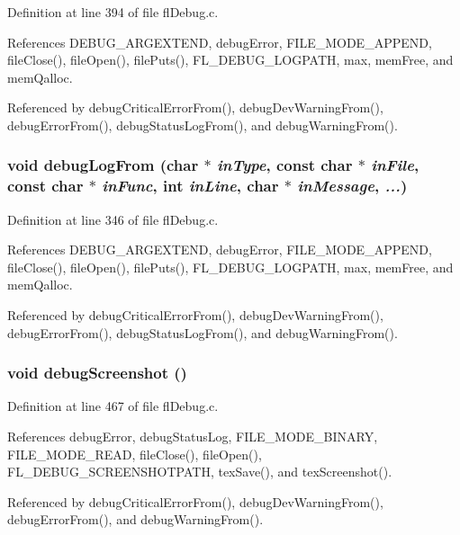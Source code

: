 Definition at line 394 of file fl\-Debug.c.

References DEBUG\_\-ARGEXTEND, debug\-Error, FILE\_\-MODE\_\-APPEND, file\-Close(), file\-Open(), file\-Puts(), FL\_\-DEBUG\_\-LOGPATH, max, mem\-Free, and mem\-Qalloc.

Referenced by debug\-Critical\-Error\-From(), debug\-Dev\-Warning\-From(), debug\-Error\-From(), debug\-Status\-Log\-From(), and debug\-Warning\-From().
\subsubsection{\setlength{\rightskip}{0pt plus 5cm}void debug\-Log\-From (char $\ast$ {\em in\-Type}, const char $\ast$ {\em in\-File}, const char $\ast$ {\em in\-Func}, int {\em in\-Line}, char $\ast$ {\em in\-Message},  {\em ...})}\label{flDebug_8c_79821f9452c6693004f6d30bb36ac990}




Definition at line 346 of file fl\-Debug.c.

References DEBUG\_\-ARGEXTEND, debug\-Error, FILE\_\-MODE\_\-APPEND, file\-Close(), file\-Open(), file\-Puts(), FL\_\-DEBUG\_\-LOGPATH, max, mem\-Free, and mem\-Qalloc.

Referenced by debug\-Critical\-Error\-From(), debug\-Dev\-Warning\-From(), debug\-Error\-From(), debug\-Status\-Log\-From(), and debug\-Warning\-From().
\subsubsection{\setlength{\rightskip}{0pt plus 5cm}void debug\-Screenshot ()}\label{flDebug_8c_0ff85d5de01d6b009ced35171955ea39}




Definition at line 467 of file fl\-Debug.c.

References debug\-Error, debug\-Status\-Log, FILE\_\-MODE\_\-BINARY, FILE\_\-MODE\_\-READ, file\-Close(), file\-Open(), FL\_\-DEBUG\_\-SCREENSHOTPATH, tex\-Save(), and tex\-Screenshot().

Referenced by debug\-Critical\-Error\-From(), debug\-Dev\-Warning\-From(), debug\-Error\-From(), and debug\-Warning\-From().
